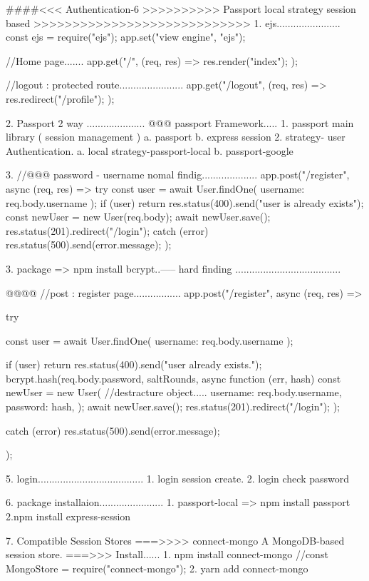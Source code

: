 ####<<< Authentication-6 >>>>>>>>>> Passport local strategy session based >>>>>>>>>>>>>>>>>>>>>>>>>>>>
1. ejs.......................
      const ejs = require("ejs");
      app.set("view engine", "ejs");

      //Home page.......
      app.get("/", (req, res) => {
        res.render("index");
      });

  //logout : protected route.......................
      app.get("/logout", (req, res) => {
        res.redirect("/profile");
      });  

2. Passport 2 way .....................
   @@@ passport Framework.....
      1. passport main library ( session management )
         a. passport
         b. express session 
      2. strategy- user Authentication.
         a. local strategy-passport-local
         b. passport-google

3. //@@@ password - username nomal findig....................
 app.post("/register", async (req, res) => {
  try {
    const user = await User.findOne({ username: req.body.username });
    if (user) return res.status(400).send("user is already exists");
      const newUser = new User(req.body);
      await newUser.save();
      res.status(201).redirect("/login");
  } catch (error) {
    res.status(500).send(error.message);
  }
});

3. package => npm install bcrypt..----- hard finding ......................................

@@@@ //post : register page.................
app.post("/register", async (req, res) => {
  try {
    const user = await User.findOne({ username: req.body.username });

    if (user) return res.status(400).send("user already exists.");
    bcrypt.hash(req.body.password, saltRounds, async function (err, hash) {
      const newUser = new User({
        //destracture object.....
        username: req.body.username,
        password: hash,
      });
      await newUser.save();
      res.status(201).redirect("/login");
    });
  } catch (error) {
    res.status(500).send(error.message);
  }
});

5. login...................................... 
   1. login session create.
   2. login check password

6. package installaion.......................
   1. passport-local =>  npm install passport 
   2.npm install express-session

7. Compatible Session Stores
   ===>>>> connect-mongo A MongoDB-based session store.
   ===>>> Install......
          1. npm install connect-mongo  //const MongoStore = require("connect-mongo");
          2. yarn add connect-mongo
          
